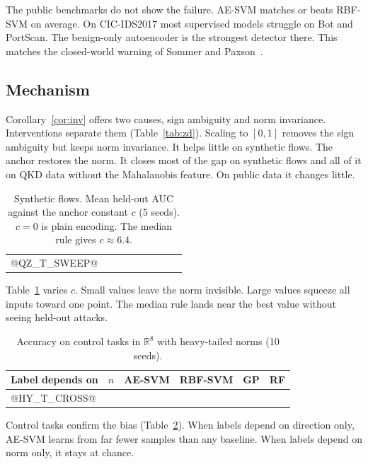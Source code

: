 \documentclass[journal]{IEEEtran}
\begin{document}
The public benchmarks do not show the failure. AE-SVM matches or beats RBF-SVM on
average. On CIC-IDS2017 most supervised models struggle on Bot and PortScan. The
benign-only autoencoder is the strongest detector there. This matches the
closed-world warning of Sommer and Paxson~\cite{sommer2010outside}.

\subsection{Mechanism}
\label{sec:res-mechanism}

Corollary~\ref{cor:inv} offers two causes, sign ambiguity and norm invariance.
Interventions separate them (Table~\ref{tab:zd}). Scaling to $[0,1]$ removes the
sign ambiguity but keeps norm invariance. It helps little on synthetic flows. The
anchor restores the norm. It closes most of the gap on synthetic flows and all of
it on QKD data without the Mahalanobis feature. On public data it changes little.

\begin{table}[t]
  \centering
  \caption{Synthetic flows. Mean held-out AUC against the anchor constant $c$ (5 seeds). $c=0$ is plain encoding. The median rule gives $c\approx6.4$.}
  \label{tab:sweep}
  \footnotesize
  \setlength{\tabcolsep}{2.8pt}
  \begin{tabular}{lcccccccc}
    \toprule
@QZ_T_SWEEP@
    \bottomrule
  \end{tabular}
\end{table}

Table~\ref{tab:sweep} varies $c$. Small values leave the norm invisible. Large
values squeeze all inputs toward one point. The median rule lands near the best
value without seeing held-out attacks.

\begin{table}[t]
  \centering
  \caption{Accuracy on control tasks in $\mathbb{R}^8$ with heavy-tailed norms (10 seeds).}
  \label{tab:cross}
  \footnotesize
  \setlength{\tabcolsep}{3pt}
  \begin{tabular}{lrcccc}
    \toprule
    Label depends on & $n$ & AE-SVM & RBF-SVM & GP & RF \\
    \midrule
@HY_T_CROSS@
    \bottomrule
  \end{tabular}
\end{table}

Control tasks confirm the bias (Table~\ref{tab:cross}). When labels depend on
direction only, AE-SVM learns from far fewer samples than any baseline. When labels
depend on norm only, it stays at chance.
\end{document}
